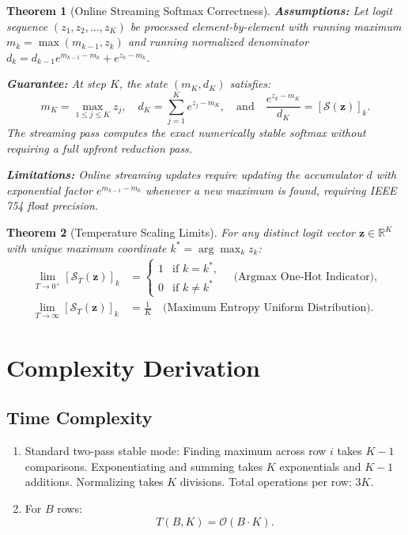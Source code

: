 \documentclass[11pt]{article}
\newtheorem{theorem}{Theorem}
\begin{document}
\begin{theorem}[Online Streaming Softmax Correctness]
\label{thm:online_softmax}
\textbf{Assumptions:}
Let logit sequence $(z_1, z_2, \dots, z_K)$ be processed element-by-element with running maximum $m_k = \max(m_{k-1}, z_k)$ and running normalized denominator $d_k = d_{k-1} e^{m_{k-1} - m_k} + e^{z_k - m_k}$.

\textbf{Guarantee:}
At step $K$, the state $(m_K, d_K)$ satisfies:
\begin{equation}
m_K = \max_{1 \le j \le K} z_j, \quad d_K = \sum_{j=1}^K e^{z_j - m_K}, \quad \text{and} \quad \frac{e^{z_k - m_K}}{d_K} = [\mathcal{S}(\mathbf{z})]_k.
\end{equation}
The streaming pass computes the exact numerically stable softmax without requiring a full upfront reduction pass.

\textbf{Limitations:}
Online streaming updates require updating the accumulator $d$ with exponential factor $e^{m_{k-1} - m_k}$ whenever a new maximum is found, requiring IEEE 754 float precision.
\end{theorem}

\begin{theorem}[Temperature Scaling Limits]
\label{thm:temperature}
For any distinct logit vector $\mathbf{z} \in \mathbb{R}^K$ with unique maximum coordinate $k^* = \arg\max_k z_k$:
\begin{align}
\lim_{T \to 0^+} [\mathcal{S}_T(\mathbf{z})]_k &= \begin{cases} 1 & \text{if } k = k^*, \\ 0 & \text{if } k \ne k^* \end{cases} \quad \text{(Argmax One-Hot Indicator)}, \\
\lim_{T \to \infty} [\mathcal{S}_T(\mathbf{z})]_k &= \frac{1}{K} \quad \text{(Maximum Entropy Uniform Distribution)}.
\end{align}
\end{theorem}

\section{Complexity Derivation}
\label{sec:complexity}

\subsection{Time Complexity}
\begin{enumerate}
    \item Standard two-pass stable mode: Finding maximum across row $i$ takes $K-1$ comparisons. Exponentiating and summing takes $K$ exponentials and $K-1$ additions. Normalizing takes $K$ divisions. Total operations per row: $3K$.
    \item For $B$ rows:
    \begin{equation}
    T(B, K) = \mathcal{O}(B \cdot K).
    \end{equation}
\end{enumerate}
\end{document}
